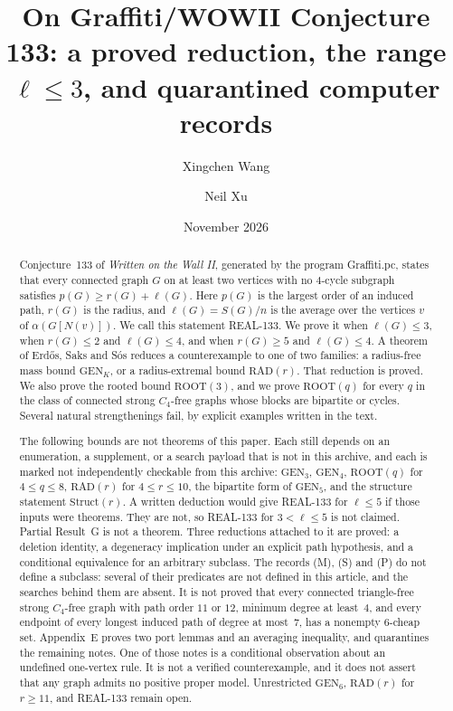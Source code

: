 \documentclass[11pt]{amsart}
\title[On Graffiti/WOWII Conjecture 133]{On Graffiti/WOWII Conjecture 133: a proved reduction, the range $\ell\le 3$, and quarantined computer records}
\author{Xingchen Wang}
\author{Neil Xu}
\date{November 2026}
\theoremstyle{definition}
\theoremstyle{remark}
\newcommand{\lr}{\ell}
\newcommand{\pp}{p}
\newcommand{\GEN}{\mathrm{GEN}}
\newcommand{\RAD}{\mathrm{RAD}}
\newcommand{\ROOT}{\mathrm{ROOT}}
\begin{document}
\begin{abstract}
Conjecture~133 of \emph{Written on the Wall II}, generated by the program Graffiti.pc, states that every connected graph $G$ on at least two vertices with no $4$-cycle subgraph satisfies $\pp(G)\ge r(G)+\lr(G)$. Here $\pp(G)$ is the largest order of an induced path, $r(G)$ is the radius, and $\lr(G)=S(G)/n$ is the average over the vertices $v$ of $\alpha(G[N(v)])$. We call this statement REAL-133. We prove it when $\lr(G)\le 3$, when $r(G)\le 2$ and $\lr(G)\le 4$, and when $r(G)\ge 5$ and $\lr(G)\le 4$. A theorem of Erd\H{o}s, Saks and S\'os reduces a counterexample to one of two families: a radius-free mass bound $\GEN_K$, or a radius-extremal bound $\RAD(r)$. That reduction is proved. We also prove the rooted bound $\ROOT(3)$, and we prove $\ROOT(q)$ for every $q$ in the class of connected strong $C_4$-free graphs whose blocks are bipartite or cycles. Several natural strengthenings fail, by explicit examples written in the text.

The following bounds are not theorems of this paper. Each still depends on an enumeration, a supplement, or a search payload that is not in this archive, and each is marked not independently checkable from this archive: $\GEN_3$, $\GEN_4$, $\ROOT(q)$ for $4\le q\le 8$, $\RAD(r)$ for $4\le r\le 10$, the bipartite form of $\GEN_5$, and the structure statement $\mathrm{Struct}(r)$. A written deduction would give REAL-133 for $\lr\le 5$ if those inputs were theorems. They are not, so REAL-133 for $3<\lr\le 5$ is not claimed. Partial Result~G is not a theorem. Three reductions attached to it are proved: a deletion identity, a degeneracy implication under an explicit path hypothesis, and a conditional equivalence for an arbitrary subclass. The records (M), (S) and (P) do not define a subclass: several of their predicates are not defined in this article, and the searches behind them are absent. It is not proved that every connected triangle-free strong $C_4$-free graph with path order $11$ or $12$, minimum degree at least~$4$, and every endpoint of every longest induced path of degree at most~$7$, has a nonempty $6$-cheap set. Appendix~E proves two port lemmas and an averaging inequality, and quarantines the remaining notes. One of those notes is a conditional observation about an undefined one-vertex rule. It is not a verified counterexample, and it does not assert that any graph admits no positive proper model. Unrestricted $\GEN_6$, $\RAD(r)$ for $r\ge 11$, and REAL-133 remain open.
\end{abstract}
\end{document}
